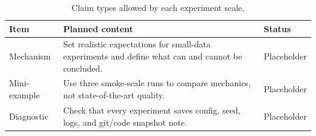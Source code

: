 \begin{table}[H]
\centering
\caption{Claim types allowed by each experiment scale.}
\label{tab:ch11-experiment-design-for-a-from-scratch-book}
\begin{tabularx}{\textwidth}{p{}X p{}}
\toprule
Item & Planned content & Status \\
\midrule
Mechanism & Set realistic expectations for small-data experiments and define what can and cannot be concluded. & Placeholder \\
Mini-example & Use three smoke-scale runs to compare mechanics, not state-of-the-art quality. & Placeholder \\
Diagnostic & Check that every experiment saves config, seed, logs, and git/code snapshot note. & Placeholder \\
\bottomrule
\end{tabularx}
\end{table}
